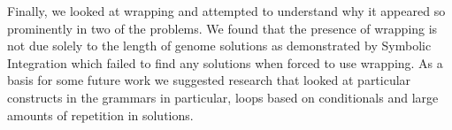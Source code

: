 Finally, we looked at wrapping and attempted to understand why it appeared so prominently in two of the problems. We found that the presence of wrapping is not due solely to the length of genome solutions as demonstrated by Symbolic Integration which failed to find any solutions when forced to use wrapping. As a basis for some future work we suggested research that looked at particular constructs in the grammars in particular, loops based on conditionals and large amounts of repetition in solutions.























